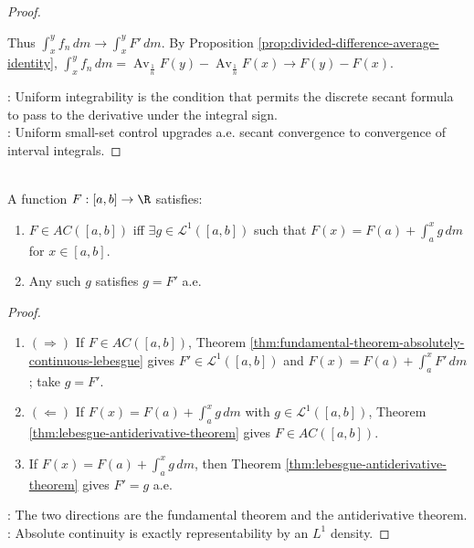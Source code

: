 \begin{theorem}
\begin{proof}
\begin{enumerate}[label=(\roman*)]
Thus $\int_x^yf_n\,dm\to\int_x^yF'\,dm$. By Proposition \ref{prop:divided-difference-average-identity}, $\int_x^yf_n\,dm=\operatorname{Av}_{\frac{1}{n}}F(y)-\operatorname{Av}_{\frac{1}{n}}F(x)\to F(y)-F(x)$.
\end{enumerate}
: Uniform integrability is the condition that permits the discrete secant formula to pass to the derivative under the integral sign.\\
: Uniform small-set control upgrades a.e. secant convergence to convergence of interval integrals.
\end{proof}
\end{theorem}

\begin{corollary} \label{cor:absolute-continuity-indefinite-integral-characterization} \\
A function $F:[a,b]\to\R$ satisfies:
\begin{enumerate}[label=(\roman*)]
\setlength{\itemsep}{0pt}
\item $F\in AC([a,b])$ iff $\exists g\in\mathscr{L}^1([a,b])$ such that $F(x)=F(a)+\int_a^xg\,dm$ for $x\in[a,b]$.
\item Any such $g$ satisfies $g=F'$ a.e.
\end{enumerate}
\begin{proof}
\begin{enumerate}[label=(\roman*)]
\setlength{\itemsep}{0pt}
\item[$(i)$]$(\Rightarrow)$ If $F\in AC([a,b])$, Theorem \ref{thm:fundamental-theorem-absolutely-continuous-lebesgue} gives $F'\in\mathscr{L}^1([a,b])$ and $F(x)=F(a)+\int_a^xF'\,dm$; take $g=F'$. 
\item[$(i)$]$(\Leftarrow)$ If $F(x)=F(a)+\int_a^xg\,dm$ with $g\in\mathscr{L}^1([a,b])$, Theorem \ref{thm:lebesgue-antiderivative-theorem} gives $F\in AC([a,b])$.
\item[$(ii)$] If $F(x)=F(a)+\int_a^xg\,dm$, then Theorem \ref{thm:lebesgue-antiderivative-theorem} gives $F'=g$ a.e.
\end{enumerate}
: The two directions are the fundamental theorem and the antiderivative theorem.\\
: Absolute continuity is exactly representability by an $L^1$ density.
\end{proof}
\end{corollary}

